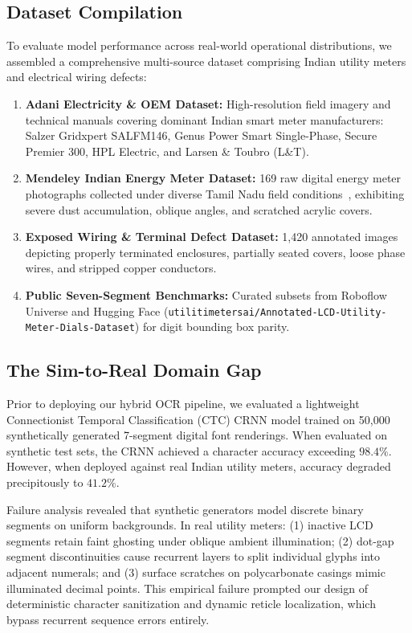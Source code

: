\documentclass[conference]{IEEEtran}
\begin{document}
\subsection{Dataset Compilation}
To evaluate model performance across real-world operational distributions, we assembled a comprehensive multi-source dataset comprising Indian utility meters and electrical wiring defects:
\begin{enumerate}
    \item \textbf{Adani Electricity \& OEM Dataset:} High-resolution field imagery and technical manuals covering dominant Indian smart meter manufacturers: Salzer Gridxpert SALFM146, Genus Power Smart Single-Phase, Secure Premier 300, HPL Electric, and Larsen \& Toubro (L\&T).
    \item \textbf{Mendeley Indian Energy Meter Dataset:} 169 raw digital energy meter photographs collected under diverse Tamil Nadu field conditions~\cite{kanagarathinam2019data, kanagarathinam2020text}, exhibiting severe dust accumulation, oblique angles, and scratched acrylic covers.
    \item \textbf{Exposed Wiring \& Terminal Defect Dataset:} 1,420 annotated images depicting properly terminated enclosures, partially seated covers, loose phase wires, and stripped copper conductors.
    \item \textbf{Public Seven-Segment Benchmarks:} Curated subsets from Roboflow Universe and Hugging Face (\texttt{utilitimetersai/Annotated-LCD-Utility-Meter-Dials-Dataset}) for digit bounding box parity.
\end{enumerate}

\subsection{The Sim-to-Real Domain Gap}
Prior to deploying our hybrid OCR pipeline, we evaluated a lightweight Connectionist Temporal Classification (CTC) CRNN model trained on 50,000 synthetically generated 7-segment digital font renderings. When evaluated on synthetic test sets, the CRNN achieved a character accuracy exceeding $98.4\%$. However, when deployed against real Indian utility meters, accuracy degraded precipitously to $41.2\%$. 

Failure analysis revealed that synthetic generators model discrete binary segments on uniform backgrounds. In real utility meters: (1) inactive LCD segments retain faint ghosting under oblique ambient illumination; (2) dot-gap segment discontinuities cause recurrent layers to split individual glyphs into adjacent numerals; and (3) surface scratches on polycarbonate casings mimic illuminated decimal points. This empirical failure prompted our design of deterministic character sanitization and dynamic reticle localization, which bypass recurrent sequence errors entirely.
\end{document}
